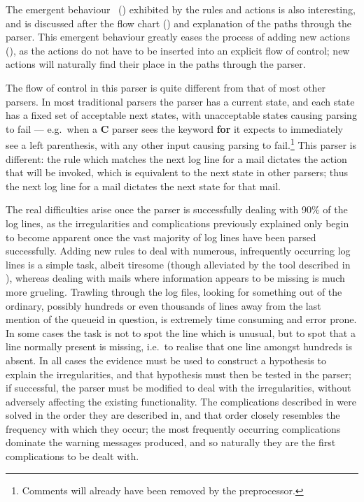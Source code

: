The emergent behaviour~\cite{Wikipedia-Emergence} () exhibited by the rules and actions is also interesting, and is
discussed after the flow chart () and explanation of
the paths through the parser.  This emergent behaviour greatly eases the
process of adding new actions (), as the
actions do not have to be inserted into an explicit flow of control; new
actions will naturally find their place in the paths through the parser.

The flow of control in this parser is quite different from that of most
other parsers.  In most traditional parsers the parser has a current state,
and each state has a fixed set of acceptable next states, with unacceptable
states causing parsing to fail --- e.g.\ when a \textbf{C} parser sees the
keyword \textbf{for} it expects to immediately see a left parenthesis, with
any other input causing parsing to fail.\footnote{Comments will already
have been removed by the preprocessor.}  This parser is different: the
rule which matches the next log line for a mail dictates the action that
will be invoked, which is equivalent to the next state in other parsers;
thus the next log line for a mail dictates the next state for that mail.

The real difficulties arise once the parser is successfully dealing with
90\% of the log lines, as the irregularities and complications previously
explained only begin to become apparent once the vast majority of log lines
have been parsed successfully.  Adding new rules to deal with numerous,
infrequently occurring log lines is a simple task, albeit tiresome (though
alleviated by the tool described in ),
whereas dealing with mails where information appears to be missing is much
more grueling.  Trawling through the log files, looking for something out
of the ordinary, possibly hundreds or even thousands of lines away from the
last mention of the queueid in question, is extremely time consuming and
error prone.  In some cases the task is not to spot the line which is
unusual, but to spot that a line normally present is missing, i.e.\ to
realise that one line amongst hundreds is absent.  In all cases the
evidence must be used to construct a hypothesis to explain the
irregularities, and that hypothesis must then be tested in the parser; if
successful, the parser must be modified to deal with the irregularities,
without adversely affecting the existing functionality.  The complications
described in  were solved in the order
they are described in, and that order closely resembles the frequency with
which they occur; the most frequently occurring complications dominate the
warning messages produced, and so naturally they are the first
complications to be dealt with.

